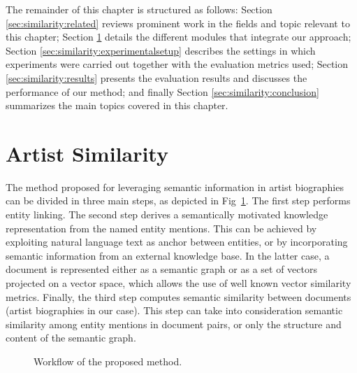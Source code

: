 The remainder of this chapter is structured as follows: Section \ref{sec:similarity:related} reviews prominent work in the fields and topic relevant to this chapter; Section \ref{sec:similarity:methodology} details the different modules that integrate our approach; Section \ref{sec:similarity:experimentalsetup} describes the settings in which experiments were carried out together with the evaluation metrics used; Section \ref{sec:similarity:results} presents the evaluation results and discusses the performance of our method; and finally Section \ref{sec:similarity:conclusion} summarizes the main topics covered in this chapter.

\section{Artist Similarity}
\label{sec:similarity:methodology}

The method proposed for leveraging semantic information in artist biographies can be divided in three main steps, as depicted in Fig~\ref{fig:similarity:methodology}.
The first step performs entity linking. The second step derives a semantically motivated knowledge representation from the named entity mentions. This can be achieved by exploiting natural language text as anchor between entities, or by incorporating semantic information from an external knowledge base. In the latter case, a document is represented either as a semantic graph or as a set of vectors projected on a vector space, which allows the use of well known vector similarity metrics.
Finally, the third step computes semantic similarity between documents (artist biographies in our case). This step can take into consideration semantic similarity among entity mentions in document pairs, or only the structure and content of the semantic graph.


\begin{figure}[!htp]
\centerline{}
\caption{Workflow of the proposed method.}
\label{fig:similarity:methodology}
\end{figure}

